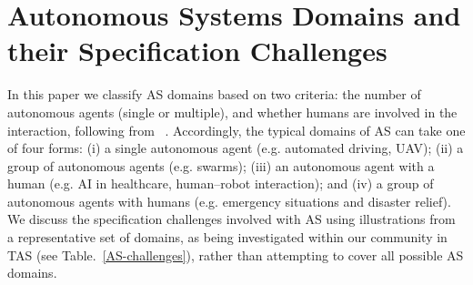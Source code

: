 \documentclass[sigconf,nonacm]{acmart}%
\begin{document}
	\section{Autonomous Systems Domains and their Specification Challenges}\label{as-domains}
	In this paper we classify AS domains based on two criteria: the number of autonomous agents (single or multiple), and whether humans are involved in the interaction, following from ~\cite{Schneiders2022}. Accordingly, the typical domains of AS can take one of four forms: (i) a single autonomous agent (e.g. automated driving, UAV); (ii) a group of autonomous agents (e.g. swarms); (iii) an autonomous agent with a human (e.g. AI in healthcare, human–robot interaction); and (iv) a group of autonomous agents with humans (e.g. emergency situations and disaster relief). We discuss the specification challenges involved with AS using illustrations from a representative set of domains, as being investigated within our community in TAS (see Table.~\ref{AS-challenges}), rather than attempting to cover all possible AS domains. 
%
	
\end{document}
